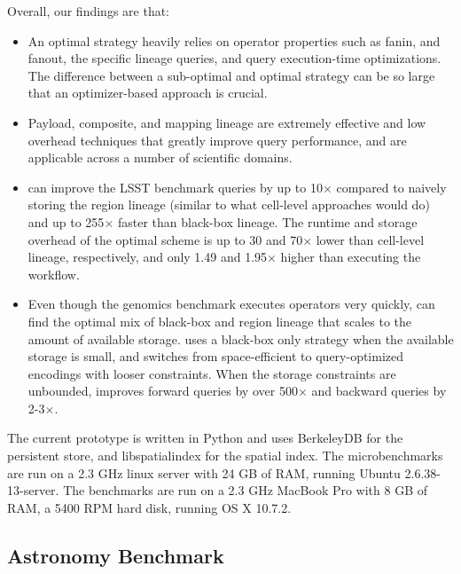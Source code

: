 Overall, our findings are that:
\begin{itemize}

\item An optimal strategy heavily relies on operator properties such as fanin,
    and fanout, the specific lineage queries, and query execution-time
    optimizations.  The difference between a sub-optimal and optimal strategy
    can be so large that an optimizer-based approach is crucial.

\item Payload, composite, and mapping lineage are extremely effective and
    low overhead techniques that greatly improve query performance, and are
    applicable across a number of scientific domains.

\item  \sys{} can improve the LSST benchmark queries by up to 10$\times$
    compared to naively storing the region lineage (similar to what
    cell-level approaches would do) and up to 255$\times$ faster than black-box
    lineage.   The runtime and storage overhead of the optimal scheme is up to
    30 and 70$\times$ lower than cell-level lineage, respectively, and only
    1.49 and 1.95$\times$ higher than executing the workflow.

\item Even though the genomics benchmark executes operators very quickly,
    \sys{} can find the optimal mix of black-box and region lineage that scales
    to the amount of available storage.  \sys{} uses a black-box only strategy
    when the available storage is small, and switches from space-efficient to
    query-optimized encodings with looser constraints.  When the storage
    constraints are unbounded, \sys{} improves forward queries by over
    500$\times$ and backward queries by 2-3$\times$.

\end{itemize}

The current prototype is written in Python and uses BerkeleyDB for the
persistent store, and libspatialindex for the spatial index.  The
microbenchmarks are run on a 2.3 GHz linux server with 24 GB of RAM, running
Ubuntu 2.6.38-13-server.  The benchmarks are run on a 2.3 GHz MacBook Pro with
8 GB of RAM, a 5400 RPM hard disk, running OS X 10.7.2.

\subsection{Astronomy Benchmark}





